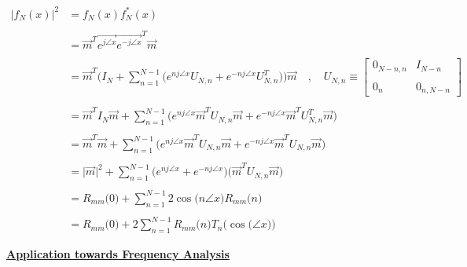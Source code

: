\documentclass{article}
\begin{document}
\begin{align*}
    \Big|f_{N}(x)\Big|^{2}&= f_{N}(x)f^{*}_{N}(x) \\ \\
                          &= \vec{m}^{T}\vec{e^{j\angle{x}}}\vec{e^{-j\angle{x}}}^{T}\vec{m} \\ \\
                          &= \vec{m}^{T}\Bigg(I_{N} + \sum_{n=1}^{N - 1}\Big(e^{nj\angle{x}}U_{N, n} + e^{-nj\angle{x}}U_{N, n}^{T}\Big)\Bigg)\vec{m} \quad , \quad U_{N, n} \equiv \begin{bmatrix}
                                                                                                                                                                                        0_{N - n, n} & I_{N - n} \\ \\
                                                                                                                                                                                        0_{n} & 0_{n, N - n}
                                                                                                                                                                                      \end{bmatrix} \\ \\
                          &= \vec{m}^{T}I_{N}\vec{m} + \sum_{n=1}^{N - 1}\Bigg(e^{nj\angle{x}}\vec{m}^{T}U_{N, n}\vec{m} + e^{-nj\angle{x}}\vec{m}^{T}U_{N, n}^{T}\vec{m}\Bigg) \\ \\
                          &= \vec{m}^{T}\vec{m} + \sum_{n=1}^{N - 1}\Bigg(e^{nj\angle{x}}\vec{m}^{T}U_{N, n}\vec{m} + e^{-nj\angle{x}}\vec{m}^{T}U_{N, n}\vec{m}\Bigg) \\ \\
                          &= \big|\vec{m}\big|^{2} + \sum_{n=1}^{N - 1}\Big(e^{nj\angle{x}} + e^{-nj\angle{x}}\Big)\Big(\vec{m}^{T}U_{N, n}\vec{m}\Big) \\ \\
                          &= R_{mm}\big(0\big) + \sum_{n=1}^{N - 1}2\cos\big(n\angle{x}\big)R_{mm}\big(n\big) \\ \\
                          &= R_{mm}\big(0\big) + 2\sum_{n=1}^{N - 1}R_{mm}\big(n\big)T_{n}\Big(\cos\big(\angle{x}\big)\Big)
\end{align*}

\textbf{\underline{Application towards Frequency Analysis}}
\end{document}

